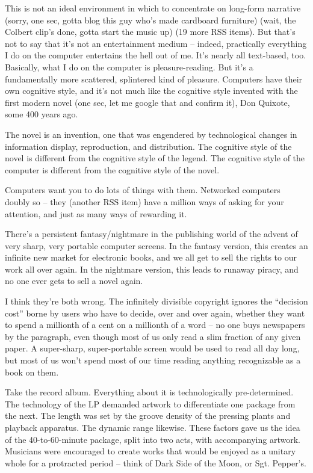 This is not an ideal environment in which to concentrate on
long-form narrative (sorry, one sec, gotta blog this guy who's made
cardboard furniture) (wait, the Colbert clip's done, gotta start
the music up) (19 more RSS items). But that's not to say that it's
not an entertainment medium -- indeed, practically everything I do
on the computer entertains the hell out of me. It's nearly all
text-based, too. Basically, what I do on the computer is
pleasure-reading. But it's a fundamentally more scattered,
splintered kind of pleasure. Computers have their own cognitive
style, and it's not much like the cognitive style invented with the
first modern novel (one sec, let me google that and confirm it),
Don Quixote, some 400 years ago.

The novel is an invention, one that was engendered by technological
changes in information display, reproduction, and distribution. The
cognitive style of the novel is different from the cognitive style
of the legend. The cognitive style of the computer is different
from the cognitive style of the novel.

Computers want you to do lots of things with them. Networked
computers doubly so -- they (another RSS item) have a million ways
of asking for your attention, and just as many ways of rewarding
it.

There's a persistent fantasy/nightmare in the publishing world of
the advent of very sharp, very portable computer screens. In the
fantasy version, this creates an infinite new market for electronic
books, and we all get to sell the rights to our work all over
again. In the nightmare version, this leads to runaway piracy, and
no one ever gets to sell a novel again.

I think they're both wrong. The infinitely divisible copyright
ignores the ``decision cost'' borne by users who have to decide, over
and over again, whether they want to spend a millionth of a cent on
a millionth of a word -- no one buys newspapers by the paragraph,
even though most of us only read a slim fraction of any given
paper. A super-sharp, super-portable screen would be used to read
all day long, but most of us won't spend most of our time reading
anything recognizable as a book on them.

Take the record album. Everything about it is technologically
pre-determined. The technology of the LP demanded artwork to
differentiate one package from the next. The length was set by the
groove density of the pressing plants and playback apparatus. The
dynamic range likewise. These factors gave us the idea of the
40-to-60-minute package, split into two acts, with accompanying
artwork. Musicians were encouraged to create works that would be
enjoyed as a unitary whole for a protracted period -- think of Dark
Side of the Moon, or Sgt. Pepper's.

